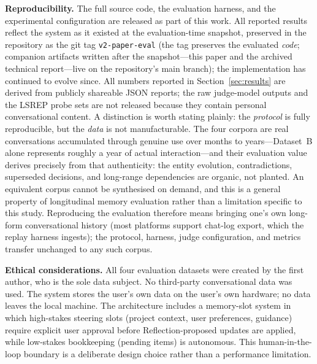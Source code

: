 \documentclass[11pt,a4paper]{article}
\begin{document}
\textbf{Reproducibility.} The full source code, the evaluation harness, and the experimental configuration are released as part of this work. All reported results reflect the system as it existed at the evaluation-time snapshot, preserved in the repository as the git tag \texttt{v2-paper-eval} (the tag preserves the evaluated \emph{code}; companion artifacts written after the snapshot---this paper and the archived technical report---live on the repository's main branch); the implementation has continued to evolve since. All numbers reported in Section~\ref{sec:results} are derived from publicly shareable JSON reports; the raw judge-model outputs and the LSREP probe sets are not released because they contain personal conversational content. A distinction is worth stating plainly: the \emph{protocol} is fully reproducible, but the \emph{data} is not manufacturable. The four corpora are real conversations accumulated through genuine use over months to years---Dataset~B alone represents roughly a year of actual interaction---and their evaluation value derives precisely from that authenticity: the entity evolution, contradictions, superseded decisions, and long-range dependencies are organic, not planted. An equivalent corpus cannot be synthesised on demand, and this is a general property of longitudinal memory evaluation rather than a limitation specific to this study. Reproducing the evaluation therefore means bringing one's own long-form conversational history (most platforms support chat-log export, which the replay harness ingests); the protocol, harness, judge configuration, and metrics transfer unchanged to any such corpus.

\textbf{Ethical considerations.} All four evaluation datasets were created by the first author, who is the sole data subject. No third-party conversational data was used. The system stores the user's own data on the user's own hardware; no data leaves the local machine. The architecture includes a memory-slot system in which high-stakes steering slots (project context, user preferences, guidance) require explicit user approval before Reflection-proposed updates are applied, while low-stakes bookkeeping (pending items) is autonomous. This human-in-the-loop boundary is a deliberate design choice rather than a performance limitation.
\end{document}
